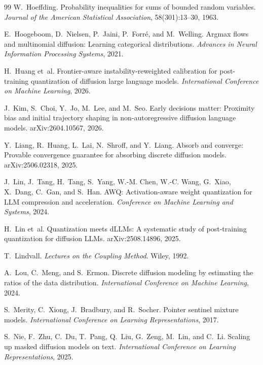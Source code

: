 \begin{thebibliography}{99}
W.~Hoeffding.
Probability inequalities for sums of bounded random variables.
\emph{Journal of the American Statistical Association}, 58(301):13--30, 1963.

E.~Hoogeboom, D.~Nielsen, P.~Jaini, P.~Forr{\'e}, and M.~Welling.
Argmax flows and multinomial diffusion: Learning categorical distributions.
\emph{Advances in Neural Information Processing Systems}, 2021.

H.~Huang et~al.
Frontier-aware instability-reweighted calibration for post-training quantization of diffusion large language models.
\emph{International Conference on Machine Learning}, 2026.

J.~Kim, S.~Choi, Y.~Jo, M.~Lee, and M.~Seo.
Early decisions matter: Proximity bias and initial trajectory shaping in non-autoregressive diffusion language models.
arXiv:2604.10567, 2026.

Y.~Liang, R.~Huang, L.~Lai, N.~Shroff, and Y.~Liang.
Absorb and converge: Provable convergence guarantee for absorbing discrete diffusion models.
arXiv:2506.02318, 2025.

J.~Lin, J.~Tang, H.~Tang, S.~Yang, W.-M. Chen, W.-C. Wang, G.~Xiao, X.~Dang, C.~Gan, and S.~Han.
AWQ: Activation-aware weight quantization for LLM compression and acceleration.
\emph{Conference on Machine Learning and Systems}, 2024.

H.~Lin et~al.
Quantization meets dLLMs: A systematic study of post-training quantization for diffusion LLMs.
arXiv:2508.14896, 2025.

T.~Lindvall.
\emph{Lectures on the Coupling Method}.
Wiley, 1992.

A.~Lou, C.~Meng, and S.~Ermon.
Discrete diffusion modeling by estimating the ratios of the data distribution.
\emph{International Conference on Machine Learning}, 2024.

S.~Merity, C.~Xiong, J.~Bradbury, and R.~Socher.
Pointer sentinel mixture models.
\emph{International Conference on Learning Representations}, 2017.

S.~Nie, F.~Zhu, C.~Du, T.~Pang, Q.~Liu, G.~Zeng, M.~Lin, and C.~Li.
Scaling up masked diffusion models on text.
\emph{International Conference on Learning Representations}, 2025.


\end{thebibliography}
